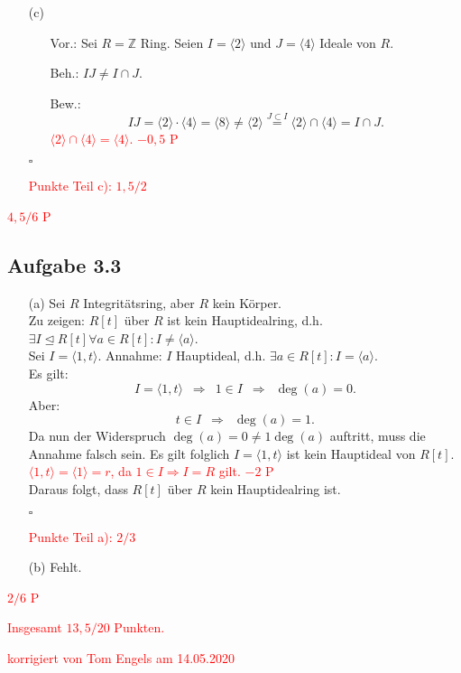 \documentclass[12pt]{article}
\newcommand{\corr}[1]{\textcolor{red}{#1}}
\newcommand{\QED}{\begin{flushright} $\square$ \end{flushright}}
\newcommand{\df}{\enspace\Longrightarrow\enspace}
\newcommand{\isIdeal}{\trianglelefteq}
\newcommand{\ideal}[1]{\langle#1\rangle}
\begin{document}
\begin{enumerate}
	\item[(c)]
	\begin{enumerate}
		\item[Vor.:] Sei $R=\mathbb{Z}$ Ring. Seien $I=\ideal{2}$ und $J=\ideal{4}$ Ideale von $R$. \\
		\item[Beh.:] $IJ\neq I\cap J$. \\
		\item[Bew.:] $$IJ=\ideal{2}\cdot\ideal{4}=\ideal{8}\neq\ideal{2}\overset{J\subset I}{=}\ideal{2}\cap\ideal{4}=I\cap J.$$
\corr{$\ideal{2}\cap\ideal{4}=\ideal{4}$. $-0,5$ P}
	\end{enumerate}
	\QED
\corr{Punkte Teil c): $1,5/2$}
\end{enumerate}
\corr{$4,5/6$ P}

\subsection*{Aufgabe 3.3}
\begin{enumerate}
	\item[(a)] Sei $R$ Integritätsring, aber $R$ kein Körper. \\
		Zu zeigen: $R[t]$ über $R$ ist kein Hauptidealring, d.h. $\exists I\isIdeal R[t]\forall a\in R[t]: I\neq\ideal{a}$.  \\
		Sei $I=\ideal{1,t}$. Annahme: $I$ Hauptideal, d.h. $\exists a\in R[t]: I=\ideal{a}$. \\
		Es gilt: $$I=\ideal{1,t}\df 1\in I\df\deg(a)=0.$$
		Aber:
		$$t\in I\df\deg(a)=1.$$
		Da nun der Widerspruch $\deg(a)=0\neq 1\deg(a)$ auftritt, muss die Annahme falsch sein. Es gilt folglich $I=\ideal{1,t}$ ist kein Hauptideal von $R[t]$. \\
\corr{$\ideal{1,t} = \ideal{1} =r$, da $1\in I \Rightarrow I=R$ gilt. $-2$ P}\\
		Daraus folgt, dass $R[t]$ über $R$ kein Hauptidealring ist.
		\QED
\corr{Punkte Teil a): $2/3$}
		
		\item[(b)] Fehlt.
\end{enumerate}
\corr{$2/6$ P}

\bigskip

\corr{Insgesamt $13,5/20$ Punkten.}

\bigskip

\corr{korrigiert von Tom Engels am 14.05.2020}
\end{document}

